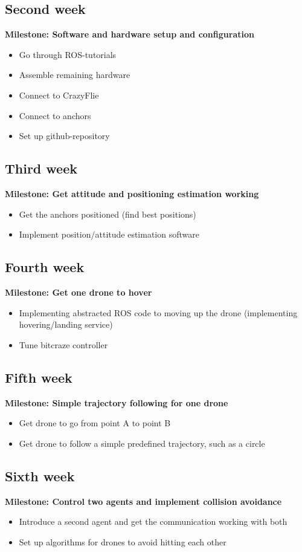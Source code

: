 \documentclass{article}
\begin{document}
\subsection{Second week}
\textbf{Milestone: Software and hardware setup and configuration}
\begin{itemize}
    \item Go through ROS-tutorials
    \item Assemble remaining hardware
    \item Connect to CrazyFlie
    \item Connect to anchors
    \item Set up github-repository
\end{itemize}

\subsection{Third week}
\textbf{Milestone: Get attitude and positioning estimation working}
\begin{itemize}
    \item Get the anchors positioned (find best positions)
    \item Implement position/attitude estimation software
\end{itemize}

\subsection{Fourth week}
\textbf{Milestone: Get one drone to hover}
\begin{itemize}
    \item Implementing abstracted ROS code to moving up the drone (implementing hovering/landing service)
    \item Tune bitcraze controller
\end{itemize}
\subsection{Fifth week}
\textbf{Milestone: Simple trajectory following for one drone}
\begin{itemize}
    \item Get drone to go from point A to point B
    \item Get drone to follow a simple predefined trajectory, such as a circle
\end{itemize}

\subsection{Sixth week}
\textbf{Milestone: Control two agents and implement collision avoidance}
\begin{itemize}
    \item Introduce a second agent and get the communication working with both
    \item Set up algorithms for drones to avoid hitting each other
\end{itemize}
\end{document}

